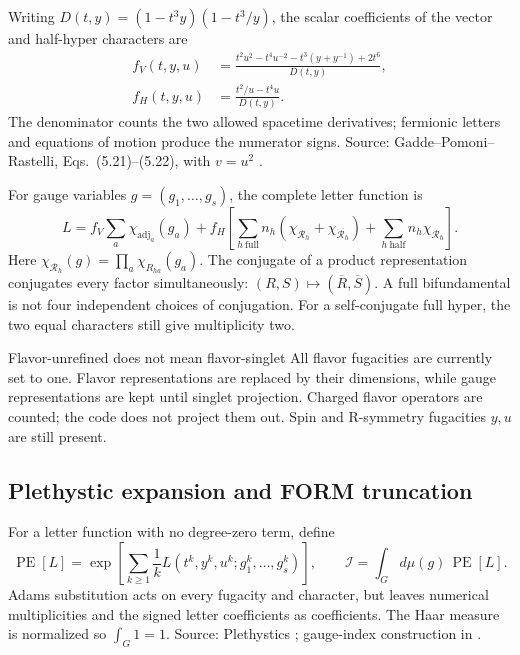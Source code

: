 \documentclass[11pt,a4paper]{article}
\numberwithin{equation}{section}
\newcommand{\PE}{\operatorname{PE}}
\newcommand{\adj}{\mathrm{adj}}
\newcommand{\src}[1]{{\small\color{muted}Source: #1.}\par}
\begin{document}
Writing $D(t,y)=(1-t^3y)(1-t^3/y)$, the scalar coefficients of the vector and
half-hyper characters are
\begin{align}
 f_V(t,y,u)&=\frac{t^2u^2-t^4u^{-2}-t^3(y+y^{-1})+2t^6}{D(t,y)},
 \label{eq:vector-letter}\\
 f_H(t,y,u)&=\frac{t^2/u-t^4u}{D(t,y)}.\label{eq:hyper-letter}
\end{align}
The denominator counts the two allowed spacetime derivatives; fermionic letters
and equations of motion produce the numerator signs.
\src{Gadde--Pomoni--Rastelli, Eqs.~(5.21)--(5.22), with $v=u^2$ \cite{gpr}}

For gauge variables $g=(g_1,\ldots,g_s)$, the complete letter function is
\begin{equation}
 L=f_V\sum_a\chi_{\adj_a}(g_a)
 +f_H\left[\sum_{h\ \mathrm{full}}n_h
 (\chi_{\mathcal R_h}+\chi_{\overline{\mathcal R_h}})
 +\sum_{h\ \mathrm{half}}n_h\chi_{\mathcal R_h}\right].
 \label{eq:total-letter}
\end{equation}
Here $\chi_{\mathcal R_h}(g)=\prod_a\chi_{R_{ha}}(g_a)$.
The conjugate of a product representation conjugates every factor simultaneously:
$(R,S)\mapsto(\overline R,\overline S)$. A full bifundamental is not four
independent choices of conjugation. For a self-conjugate full hyper, the two
equal characters still give multiplicity two.

\begin{note}{Flavor-unrefined does not mean flavor-singlet}
All flavor fugacities are currently set to one. Flavor representations are
replaced by their dimensions, while gauge representations are kept until singlet
projection. Charged flavor operators are counted; the code does not project them
out. Spin and R-symmetry fugacities $y,u$ are still present.
\end{note}

\clearpage
\subsection{Plethystic expansion and FORM truncation}
For a letter function with no degree-zero term, define
\begin{equation}
 \PE[L]=\exp\!\left[\sum_{k\geq1}\frac1k
 L(t^k,y^k,u^k;g_1^k,\ldots,g_s^k)\right],\qquad
 \mathcal I=\int_G d\mu(g)\,\PE[L].
 \label{eq:full-pe}
\end{equation}
Adams substitution acts on every fugacity and character, but leaves numerical
multiplicities and the signed letter coefficients as coefficients. The Haar
measure is normalized so $\int_G1=1$.
\src{Plethystics \cite{plethystics}; gauge-index construction in \cite{gpr}}
\end{document}

